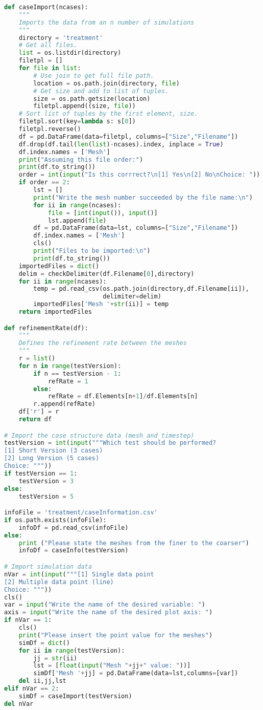 \begin{lstlisting}[language=python]
def caseImport(ncases):
    """
    Imports the data from an n number of simulations
    """
    directory = 'treatment'
    # Get all files.
    list = os.listdir(directory)
    filetpl = []
    for file in list:
        # Use join to get full file path.
        location = os.path.join(directory, file)
        # Get size and add to list of tuples.
        size = os.path.getsize(location)
        filetpl.append((size, file))
    # Sort list of tuples by the first element, size.
    filetpl.sort(key=lambda s: s[0])
    filetpl.reverse()
    df = pd.DataFrame(data=filetpl, columns=["Size","Filename"])
    df.drop(df.tail(len(list)-ncases).index, inplace = True)
    df.index.names = ['Mesh']
    print("Assuming this file order:")
    print(df.to_string())
    order = int(input("Is this corrrect?\n[1] Yes\n[2] No\nChoice: "))
    if order == 2:      
        lst = []
        print("Write the mesh number succeeded by the file name:\n")
        for ii in range(ncases): 
            file = [int(input()), input()] 
            lst.append(file) 
        df = pd.DataFrame(data=lst, columns=["Size","Filename"])
        df.index.names = ['Mesh']
        cls()
        print("Files to be imported:\n")
        print(df.to_string())
    importedFiles = dict()
    delim = checkDelimiter(df.Filename[0],directory)
    for ii in range(ncases):
        temp = pd.read_csv(os.path.join(directory,df.Filename[ii]),
                           delimiter=delim)
        importedFiles['Mesh '+str(ii)] = temp
    return importedFiles

def refinementRate(df):
    """
    Defines the refinement rate between the meshes
    """
    r = list()
    for n in range(testVersion):
        if n == testVersion - 1:
            refRate = 1
        else:
            refRate = df.Elements[n+1]/df.Elements[n]
        r.append(refRate)
    df['r'] = r
    return df

# Import the case structure data (mesh and timestep)
testVersion = int(input("""Which test should be performed?
[1] Short Version (3 cases)
[2] Long Version (5 cases)
Choice: """))
if testVersion == 1:
    testVersion = 3
else:
    testVersion = 5

infoFile = 'treatment/caseInformation.csv'
if os.path.exists(infoFile):
    infoDf = pd.read_csv(infoFile)
else: 
    print ("Please state the meshes from the finer to the coarser")  
    infoDf = caseInfo(testVersion)

# Import simulation data
nVar = int(input("""[1] Single data point
[2] Multiple data point (line)
Choice: """))
cls()
var = input("Write the name of the desired variable: ")
axis = input("Write the name of the desired plot axis: ")
if nVar == 1:
    cls()
    print("Please insert the point value for the meshes")
    simDf = dict()
    for ii in range(testVersion):
        jj = str(ii)
        lst = [float(input("Mesh "+jj+" value: "))]
        simDf['Mesh '+jj] = pd.DataFrame(data=lst,columns=[var])
    del ii,jj,lst
elif nVar == 2:
    simDf = caseImport(testVersion)
del nVar


\end{lstlisting}
